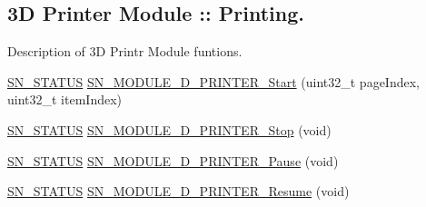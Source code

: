 \subsection*{3D Printer Module \+:\+: Printing.}
\label{_amgrpc4945650ed87e7ed89ffb690e375bfb1}%
Description of 3D Printr Module funtions. \begin{DoxyCompactItemize}
\item 
\hyperlink{group__SYSTEM__ERROR_ga4540713b9a7a18ce44d78c3a10f7442f}{S\+N\+\_\+\+S\+T\+A\+T\+US} \hyperlink{group__MODULE__3D__PRINTER_ga439ebb10f8ee839218655c5177e9110b}{S\+N\+\_\+\+M\+O\+D\+U\+L\+E\+\_\+D\+\_\+\+P\+R\+I\+N\+T\+E\+R\+\_\+\+Start} (uint32\+\_\+t page\+Index, uint32\+\_\+t item\+Index)
\item 
\hyperlink{group__SYSTEM__ERROR_ga4540713b9a7a18ce44d78c3a10f7442f}{S\+N\+\_\+\+S\+T\+A\+T\+US} \hyperlink{group__MODULE__3D__PRINTER_ga21ca69a451fafe2c9218c9a1737e1f15}{S\+N\+\_\+\+M\+O\+D\+U\+L\+E\+\_\+D\+\_\+\+P\+R\+I\+N\+T\+E\+R\+\_\+\+Stop} (void)
\item 
\hyperlink{group__SYSTEM__ERROR_ga4540713b9a7a18ce44d78c3a10f7442f}{S\+N\+\_\+\+S\+T\+A\+T\+US} \hyperlink{group__MODULE__3D__PRINTER_ga84a03238ddc0021011c12839757bf8c2}{S\+N\+\_\+\+M\+O\+D\+U\+L\+E\+\_\+D\+\_\+\+P\+R\+I\+N\+T\+E\+R\+\_\+\+Pause} (void)
\item 
\hyperlink{group__SYSTEM__ERROR_ga4540713b9a7a18ce44d78c3a10f7442f}{S\+N\+\_\+\+S\+T\+A\+T\+US} \hyperlink{group__MODULE__3D__PRINTER_gaabec8b5f01119d989d725eff26053ca5}{S\+N\+\_\+\+M\+O\+D\+U\+L\+E\+\_\+D\+\_\+\+P\+R\+I\+N\+T\+E\+R\+\_\+\+Resume} (void)
\end{DoxyCompactItemize}

